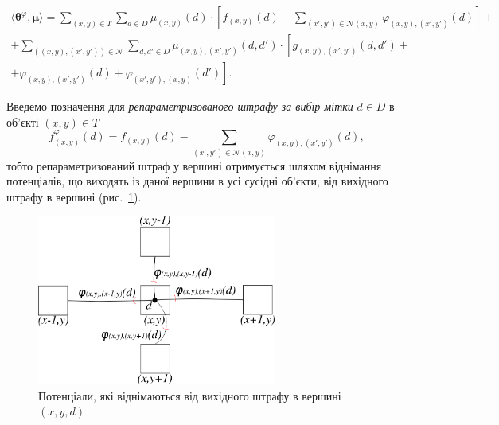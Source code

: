 \begin{equation} \label{grouped:for:reparametrization}
\begin{gathered}
    \langle \pmb{\theta}^{\varphi}, \pmb{\mu} \rangle =
    \sum \limits_{\left(x, y \right) \in T}
        \sum \limits_{d \in D}
            \mu_{\left(x, y \right)} \left(d \right) \cdot \left[
                f_{\left(x, y \right)} \left(d \right) -
                \sum \limits_{\left(x', y' \right) \in \mathcal{N} \left(x, y \right)}
                    \varphi_{\left(x, y \right), \left(x', y' \right)} \left(
                        d
                    \right)
            \right] + \\
    + \sum \limits_{\left(\left(x, y \right), \left(x', y' \right)\right)\in \mathcal{N}}
        \sum \limits_{d, d' \in D}
             \mu_{\left(x, y \right), \left(x', y' \right)} \left(d, d' \right)
             \cdot \left[
                g_{\left(x, y \right), \left(x', y' \right)} \left(d, d' \right) + \right. \\
                + \left. \varphi_{\left(x, y \right), \left(x', y' \right)} \left(
                    d
                \right) +
                \varphi_{\left(x', y' \right), \left(x, y \right)} \left(
                    d'
                \right)
             \right].
\end{gathered}
\end{equation}

Введемо позначення для \textit{репараметризованого штрафу за вибір мітки}
$d \in D$ в об'єкті $\left(x, y \right) \in T$
\begin{equation} \label{reparametrized:vertex}
    f_{\left(x, y \right)}^{\varphi} \left(d \right) =
    f_{\left(x, y \right)} \left(d \right) -
    \sum \limits_{\left(x', y' \right) \in \mathcal{N} \left(x, y \right)}
        \varphi_{\left(x, y \right), \left(x', y' \right)} \left(
            d
        \right),
\end{equation}
тобто репараметризований
штраф у вершині отримується шляхом віднімання потенціалів,
що виходять із даної вершини в усі сусідні об'єкти,
від вихідного штрафу в вершині (рис.~\ref{fig:reparametrized:vertex:weight}).

\begin{figure}[h]
  \centering
  \includegraphics[width=0.7\textwidth]{images/reparametrized_vertex_weight}
  \caption{Потенціали, які віднімаються від вихідного штрафу в вершині $\left(x, y, d \right)$}
  \label{fig:reparametrized:vertex:weight}
\end{figure}

